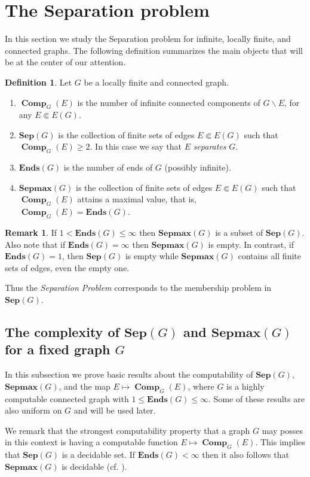 \documentclass[10pt,A4]{amsart}
\theoremstyle{definition}
\newtheorem{defn}[thm]{Definition}
\newtheorem{rmk}[thm]{Remark}
\theoremstyle{definition}
\newcommand{\sep}[1]{\mathbf{Sep}({#1})}
\newcommand{\Ends}[1]{\mathbf{Ends}({#1})}
\newcommand{\sepmax}[1]{\mathbf{Sepmax}({#1})}
\newcommand{\comp}{\operatorname{\mathbf{Comp}}}
\begin{document}
\section{The Separation problem}\label{section:separation}
In this section we study the Separation problem for infinite, locally finite, and connected graphs. The following definition summarizes the main objects that will be at the center of our attention. 
\begin{defn}\label{def:objects}
Let $G$ be a locally finite and connected graph. 
\begin{enumerate}
    \item $\comp_G(E)$ is the number of infinite connected components of $G\smallsetminus E$, for any $E\Subset E(G)$.  
    \item $\sep{G}$ is the collection of finite sets of edges $E\Subset E(G)$ such that $\comp_G(E)\geq 2$. In this case we say that $E$ \textit{separates} $G$.
    \item $\Ends{G}$ is the number of ends of $G$  (possibly infinite).
    \item $\sepmax{G}$ is the collection of finite sets of edges $E\Subset E(G)$ such that $\comp_G(E)$ attains a maximal value, that is, $\comp_G(E)=\Ends{G}$.
\end{enumerate}
\end{defn}
\begin{rmk} If  $1<\Ends{G}\leq \infty$ then $\sepmax{G}$ is a subset of $\sep{G}$. Also note that if $\Ends{G}=\infty$ then $\sepmax{G}$ is empty. In contrast, if $\Ends{G}=1$, then  $\sep{G}$ is empty while $\sepmax{G}$ contains all finite sets of edges, even the empty one. 
\end{rmk}
Thus the \textit{Separation Problem} corresponds to the membership problem in $\sep{G}$.   
\subsection{The complexity of $\sep{G}$ and $\sepmax{G}$ for a fixed graph $G$}
In this subsection we prove basic results about the computability of $\sep{G}$, $\sepmax{G}$, and the map $E\mapsto\comp_G(E)$, where $G$ is a highly computable connected graph with $1\leq \Ends{G}\leq\infty$.  Some of these results are also uniform on $G$ and will be used later. 

We remark that the strongest computability property that a graph $G$ may posses in this context is having a computable function $E\mapsto\comp_G(E)$. This implies that $\sep{G}$ is a decidable set. If $\Ends{G}<\infty$ then it also follows that $\sepmax{G}$ is decidable (cf. ).
\end{document}

